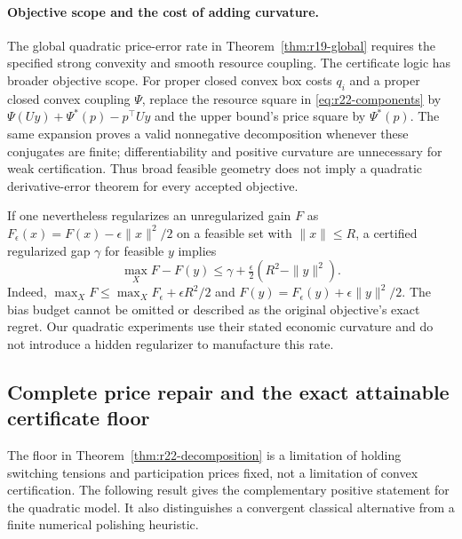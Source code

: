 \documentclass[11pt,letterpaper]{article}
\theoremstyle{definition}
\newcommand{\1}{\mathbf 1}
\begin{document}
\paragraph{Objective scope and the cost of adding curvature.}
The global quadratic price-error rate in Theorem~\ref{thm:r19-global} requires the specified strong convexity and smooth resource coupling. The certificate logic has broader objective scope. For proper closed convex box costs $q_i$ and a proper closed convex coupling $\Psi$, replace the resource square in \eqref{eq:r22-components} by
$\Psi(Uy)+\Psi^*(p)-p^\top Uy$ and the upper bound's price square by $\Psi^*(p)$. The same expansion proves a valid nonnegative decomposition whenever these conjugates are finite; differentiability and positive curvature are unnecessary for weak certification. Thus broad feasible geometry does not imply a quadratic derivative-error theorem for every accepted objective.

If one nevertheless regularizes an unregularized gain $F$ as
$F_\epsilon(x)=F(x)-\epsilon\|x\|^2/2$ on a feasible set with $\|x\|\leq R$, a certified regularized gap $\gamma$ for feasible $y$ implies
\begin{equation}\label{eq:r22-regularization}
 \max_XF-F(y)\leq\gamma+\tfrac\epsilon2(R^2-\|y\|^2).
\end{equation}
Indeed, $\max_XF\leq\max_XF_\epsilon+\epsilon R^2/2$ and
$F(y)=F_\epsilon(y)+\epsilon\|y\|^2/2$. The bias budget cannot be omitted or described as the original objective's exact regret. Our quadratic experiments use their stated economic curvature and do not introduce a hidden regularizer to manufacture this rate.

\subsection{Complete price repair and the exact attainable certificate floor}\label{sec:r22-complete}
The floor in Theorem~\ref{thm:r22-decomposition} is a limitation of holding switching tensions and participation prices fixed, not a limitation of convex certification. The following result gives the complementary positive statement for the quadratic model. It also distinguishes a convergent classical alternative from a finite numerical polishing heuristic.
\end{document}
